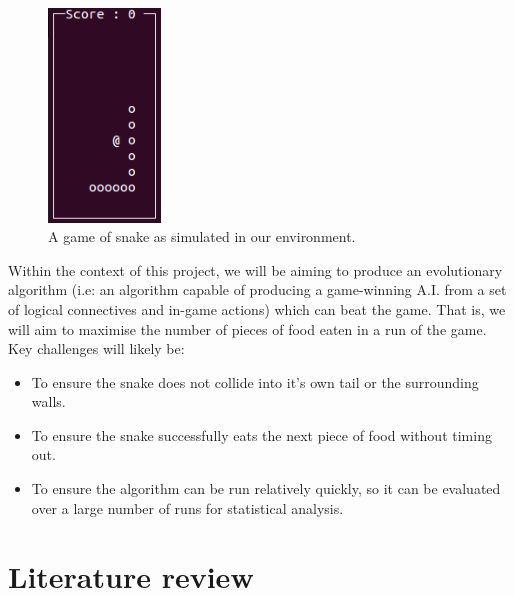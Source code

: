 \documentclass[british,10pt,a4paper]{article}
\begin{document}
\begin{minipage}{0.02\textwidth}
\end{minipage}
\begin{minipage}{0.28\textwidth}
	\begin{figure}[H]
	\centering
		\includegraphics[width=3cm,keepaspectratio]{images/snake.png}
		\caption{A game of snake as simulated in our environment.}
		\label{fig:snake}
	\end{figure}
\end{minipage}

Within the context of this project, we will be aiming to produce an evolutionary algorithm (i.e: an algorithm capable of producing a game-winning A.I. from a set of logical connectives and in-game actions) which can beat the game. That is, we will aim to maximise the number of pieces of food eaten in a run of the game. Key challenges will likely be:
\begin{itemize}
	\item To ensure the snake does not collide into it's own tail or the surrounding walls.
	\item To ensure the snake successfully eats the next piece of food without timing out.
	\item To ensure the algorithm can be run relatively quickly, so it can be evaluated over a large number of runs for statistical analysis.
\end{itemize}

\section{Literature review}
\end{document}
